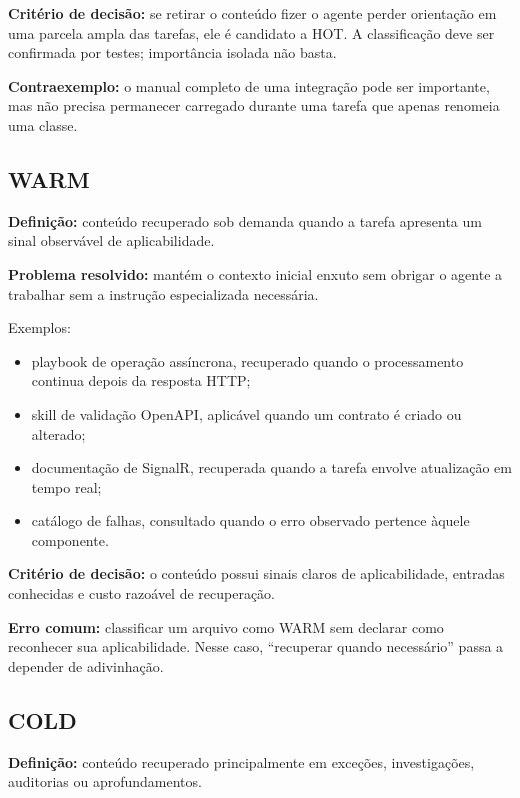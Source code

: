 \documentclass[
  10pt,
  a4paper,
  oneside]{book}
\providecommand{\tightlist}{%
  \setlength{\itemsep}{0pt}\setlength{\parskip}{0pt}}
\begin{document}
\textbf{Critério de decisão:} se retirar o conteúdo fizer o agente
perder orientação em uma parcela ampla das tarefas, ele é candidato a
HOT. A classificação deve ser confirmada por testes; importância isolada
não basta.

\textbf{Contraexemplo:} o manual completo de uma integração pode ser
importante, mas não precisa permanecer carregado durante uma tarefa que
apenas renomeia uma classe.

\hypertarget{warm}{%
\subsection{WARM}\label{warm}}

\textbf{Definição:} conteúdo recuperado sob demanda quando a tarefa
apresenta um sinal observável de aplicabilidade.

\textbf{Problema resolvido:} mantém o contexto inicial enxuto sem
obrigar o agente a trabalhar sem a instrução especializada necessária.

Exemplos:

\begin{itemize}
\tightlist
\item
  playbook de operação assíncrona, recuperado quando o processamento
  continua depois da resposta HTTP;
\item
  skill de validação OpenAPI, aplicável quando um contrato é criado ou
  alterado;
\item
  documentação de SignalR, recuperada quando a tarefa envolve
  atualização em tempo real;
\item
  catálogo de falhas, consultado quando o erro observado pertence àquele
  componente.
\end{itemize}

\textbf{Critério de decisão:} o conteúdo possui sinais claros de
aplicabilidade, entradas conhecidas e custo razoável de recuperação.

\textbf{Erro comum:} classificar um arquivo como WARM sem declarar como
reconhecer sua aplicabilidade. Nesse caso, ``recuperar quando
necessário'' passa a depender de adivinhação.

\hypertarget{cold}{%
\subsection{COLD}\label{cold}}

\textbf{Definição:} conteúdo recuperado principalmente em exceções,
investigações, auditorias ou aprofundamentos.
\end{document}
